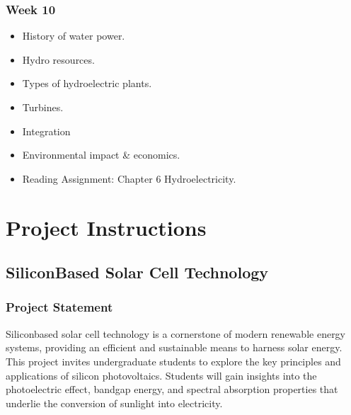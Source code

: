 \documentclass[letterpaper,10pt,english]{jupyterBook}
\begin{document}
\subsection{Week 10}
\label{\detokenize{Syllabus:week-10}}\begin{itemize}
\item {} 
\sphinxAtStartPar
History of water power.

\item {} 
\sphinxAtStartPar
Hydro resources.

\item {} 
\sphinxAtStartPar
Types of hydroelectric plants.

\item {} 
\sphinxAtStartPar
Turbines.

\item {} 
\sphinxAtStartPar
Integration

\item {} 
\sphinxAtStartPar
Environmental impact \& economics.

\item {} 
\sphinxAtStartPar
Reading Assignment: Chapter 6 \sphinxhyphen{} Hydroelectricity.

\end{itemize}

\sphinxstepscope


\chapter{Project Instructions}
\label{\detokenize{ProjectInstructions:project-instructions}}\label{\detokenize{ProjectInstructions::doc}}

\section{Silicon\sphinxhyphen{}Based Solar Cell Technology}
\label{\detokenize{ProjectInstructions:silicon-based-solar-cell-technology}}

\subsection{Project Statement}
\label{\detokenize{ProjectInstructions:project-statement}}
\sphinxAtStartPar
Silicon\sphinxhyphen{}based solar cell technology is a cornerstone of modern renewable
energy systems, providing an efficient and sustainable means to harness
solar energy. This project invites undergraduate students to explore the
key principles and applications of silicon photovoltaics. Students will
gain insights into the photoelectric effect, bandgap energy, and
spectral absorption properties that underlie the conversion of sunlight
into electricity.
\end{document}
